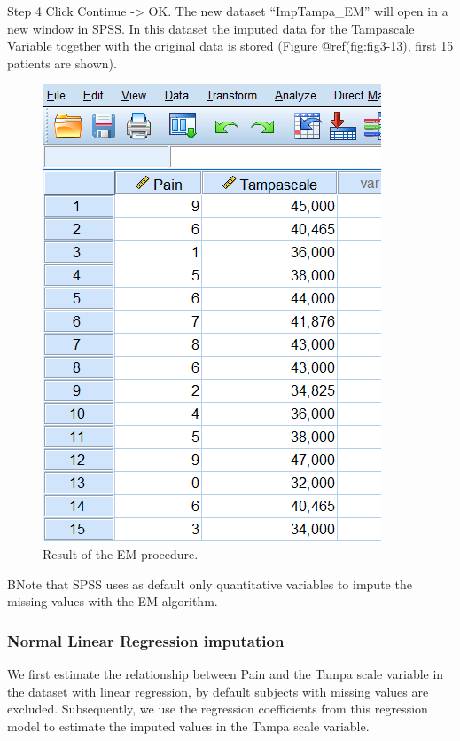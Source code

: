 \documentclass[
]{book}
\begin{document}
Step 4 Click Continue -\textgreater{} OK. The new dataset
``ImpTampa\_EM'' will open in a new window in SPSS. In this dataset the
imputed data for the Tampascale Variable together with the original data
is stored (Figure @ref(fig:fig3-13), first 15 patients are shown).

\begin{figure}

{\centering \includegraphics[width=0.7\linewidth]{images/fig3.13} 

}

\caption{Result of the EM procedure.}\label{fig:fig3-13}
\end{figure}

BNote that SPSS uses as default only quantitative variables to impute
the missing values with the EM algorithm.

\hypertarget{normal-linear-regression-imputation}{%
\subsubsection{Normal Linear Regression
imputation}\label{normal-linear-regression-imputation}}

We first estimate the relationship between Pain and the Tampa scale
variable in the dataset with linear regression, by default subjects with
missing values are excluded. Subsequently, we use the regression
coefficients from this regression model to estimate the imputed values
in the Tampa scale variable.
\end{document}
